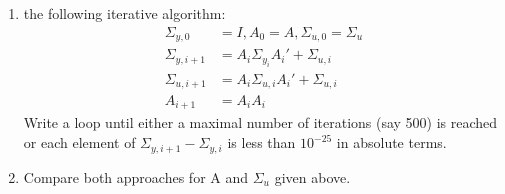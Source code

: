 \documentclass[a4paper]{scrartcl}
\begin{document}
\begin{enumerate}
\begin{enumerate}
\begin{solution}
		\end{solution}
		\item the following iterative algorithm:
			\begin{align*}
			\Sigma_{y,0} &= I, A_0 = A, \Sigma_{u,0} = \Sigma_{u}\\
			\Sigma_{y,i+1} &= A_i \Sigma_{y_i} A_i' + \Sigma_{u,i}\\
			\Sigma_{u,i+1} &= A_i \Sigma_{u,i} A_i' + \Sigma_{u,i}\\
			A_{i+1} &= A_i A_i
			\end{align*}
			Write a loop until either a maximal number of iterations (say 500) is reached or each element of $\Sigma_{y,i+1}-\Sigma_{y,i}$ is less than $10^{-25}$ in absolute terms.
		\begin{solution}

		\end{solution}
	\item Compare both approaches for A and $\Sigma_u$ given above.
	\begin{solution}

		
	\end{solution}
	\end{enumerate}
\begin{solution}
	
	
\end{solution}

	
\end{enumerate}
\newpage
\end{document}
